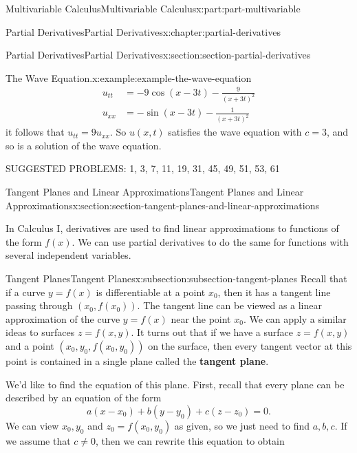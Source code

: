 \documentclass[twoside,10pt,]{tufte-book}
\newcommand{\terminology}[1]{\textbf{#1}}
\numberwithin{equation}{part}
\begin{document}
\begin{partptx}{Multivariable Calculus}{}{Multivariable Calculus}{}{}{x:part:part-multivariable}
\begin{chapterptx}{Partial Derivatives}{}{Partial Derivatives}{}{}{x:chapter:partial-derivatives}
\begin{sectionptx}{Partial Derivatives}{}{Partial Derivatives}{}{}{x:section:section-partial-derivatives}
\begin{example}{The Wave Equation.}{x:example:example-the-wave-equation}
\begin{align*}
u_{tt} & = -9\cos(x-3t) - \frac{9}{(x+3t)^{2}} \\
u_{xx} & = -\sin(x-3t) - \frac{1}{(x+3t)^{2}} 
\end{align*}
it follows that \(u_{tt} = 9u_{xx}\). So \(u(x,t)\) satisfies the wave equation with \(c=3\), and so is a solution of the wave equation.%
\end{example}
\begin{conclusion}{}%
SUGGESTED PROBLEMS: 1, 3, 7, 11, 19, 31, 45, 49, 51, 53, 61%
\end{conclusion}%
\end{sectionptx}
%
%
\typeout{************************************************}
\typeout{************************************************}
%
\begin{sectionptx}{Tangent Planes and Linear Approximations}{}{Tangent Planes and Linear Approximations}{}{}{x:section:section-tangent-planes-and-linear-approximations}
\begin{introduction}{}%
In Calculus I, derivatives are used to find linear approximations to functions of the form \(f(x)\). We can use partial derivatives to do the same for functions with several independent variables.%
\end{introduction}%
%
%
\typeout{************************************************}
\typeout{************************************************}
%
\begin{subsectionptx}{Tangent Planes}{}{Tangent Planes}{}{}{x:subsection:subsection-tangent-planes}
Recall that if a curve \(y=f(x)\) is differentiable at a point \(x_{0}\), then it has a tangent line passing through \((x_{0},f(x_{0})).\) The tangent line can be viewed as a linear approximation of the curve \(y=f(x)\) near the point \(x_{0}\). We can apply a similar ideas to surfaces \(z = f(x,y)\). It turns out that if we have a surface \(z = f(x,y)\) and a point \((x_{0},y_{0}, f(x_{0},y_{0}))\) on the surface, then every tangent vector at this point is contained in a single plane called the \terminology{tangent plane}.%
\par
We'd like to find the equation of this plane. First, recall that every plane can be described by an equation of the form%
\begin{equation*}
a(x-x_{0})+b(y-y_{0})+c(z-z_{0}) = 0.
\end{equation*}
We can view \(x_{0},y_{0}\) and \(z_{0} = f(x_{0},y_{0})\) as given, so we just need to find \(a,b,c\). If we assume that \(c\neq 0\), then we can rewrite this equation to obtain%

\end{subsectionptx}
\end{sectionptx}
\end{chapterptx}
\end{partptx}
\end{document}
